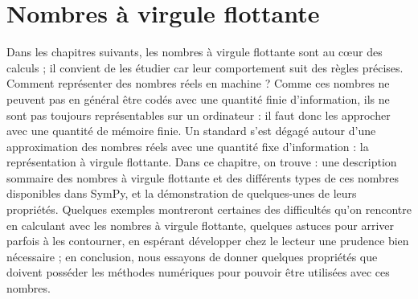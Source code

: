 \chapter{Nombres à virgule flottante}
Dans les chapitres suivants, les nombres à virgule flottante sont au cœur des
calculs ; il convient de les étudier car leur comportement suit des règles précises.
Comment représenter des nombres réels en machine ? Comme ces nombres ne
peuvent pas en général être codés avec une quantité finie d’information, ils ne
sont pas toujours représentables sur un ordinateur : il faut donc les approcher
avec une quantité de mémoire finie.
Un standard s’est dégagé autour d’une approximation des nombres réels avec
une quantité fixe d’information : la représentation à virgule flottante.
Dans ce chapitre, on trouve : une description sommaire des nombres à virgule
flottante et des différents types de ces nombres disponibles dans SymPy, et la 
démonstration de quelques-unes de leurs propriétés. Quelques exemples montreront
certaines des difficultés qu’on rencontre en calculant avec les nombres à virgule
flottante, quelques astuces pour arriver parfois à les contourner, en espérant 
développer chez le lecteur une prudence bien nécessaire ; en conclusion, nous essayons
de donner quelques propriétés que doivent posséder les méthodes numériques pour
pouvoir être utilisées avec ces nombres.